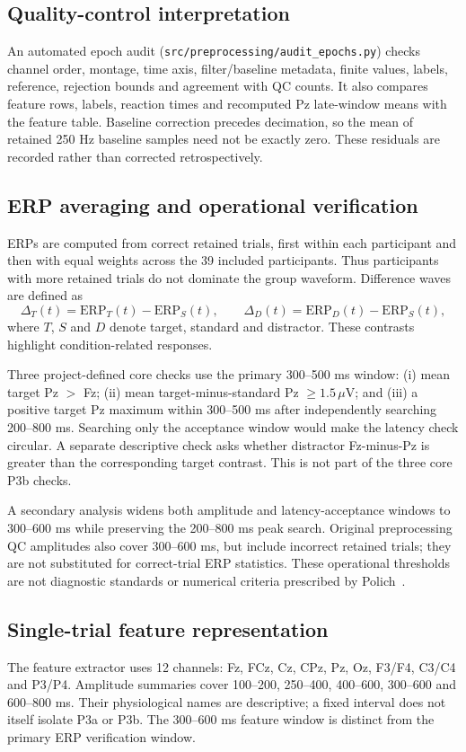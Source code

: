 \documentclass[11pt,a4paper]{article}
\newcommand{\code}[1]{\nolinkurl{#1}}
\begin{document}
\subsection{Quality-control interpretation}
An automated epoch audit (\code{src/preprocessing/audit_epochs.py}) checks channel order, montage, time axis, filter/baseline metadata, finite values, labels, reference, rejection bounds and agreement with QC counts. It also compares feature rows, labels, reaction times and recomputed Pz late-window means with the feature table. Baseline correction precedes decimation, so the mean of retained 250 Hz baseline samples need not be exactly zero. These residuals are recorded rather than corrected retrospectively.

\subsection{ERP averaging and operational verification}
ERPs are computed from correct retained trials, first within each participant and then with equal weights across the 39 included participants. Thus participants with more retained trials do not dominate the group waveform. Difference waves are defined as
\begin{equation}
\Delta_T(t)=\mathrm{ERP}_T(t)-\mathrm{ERP}_S(t),\qquad
\Delta_D(t)=\mathrm{ERP}_D(t)-\mathrm{ERP}_S(t),
\end{equation}
where $T$, $S$ and $D$ denote target, standard and distractor. These contrasts highlight condition-related responses.

Three project-defined core checks use the primary 300--500 ms window: (i) mean target Pz $>$ Fz; (ii) mean target-minus-standard Pz $\geq1.5\,\mu$V; and (iii) a positive target Pz maximum within 300--500 ms after independently searching 200--800 ms. Searching only the acceptance window would make the latency check circular. A separate descriptive check asks whether distractor Fz-minus-Pz is greater than the corresponding target contrast. This is not part of the three core P3b checks.

A secondary analysis widens both amplitude and latency-acceptance windows to 300--600 ms while preserving the 200--800 ms peak search. Original preprocessing QC amplitudes also cover 300--600 ms, but include incorrect retained trials; they are not substituted for correct-trial ERP statistics. These operational thresholds are not diagnostic standards or numerical criteria prescribed by Polich~\cite{polich}.

\subsection{Single-trial feature representation}
The feature extractor uses 12 channels: Fz, FCz, Cz, CPz, Pz, Oz, F3/F4, C3/C4 and P3/P4. Amplitude summaries cover 100--200, 250--400, 400--600, 300--600 and 600--800 ms. Their physiological names are descriptive; a fixed interval does not itself isolate P3a or P3b. The 300--600 ms feature window is distinct from the primary ERP verification window.
\end{document}
